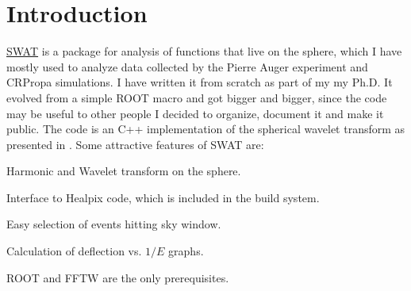 \documentclass[12pt]{article}
\begin{document}
  \vfill


\newpage
\tableofcontents

\newpage
\section{Introduction} \label{ch::Introduction}

\href{http://www.ifi.unicamp.br/~mzimbres}{SWAT} is a package for analysis of
functions that live on the sphere, which I have mostly used to analyze data 
collected by the Pierre Auger experiment and CRPropa simulations. I have written it from
scratch as part of my my Ph.D. It evolved from a simple ROOT macro and
got bigger and bigger, since the code may be useful to other people I decided
to organize, document it and make it public. The code is an C++ implementation
of the spherical wavelet transform as presented in \cite{wiaux}. Some
attractive features of SWAT are:

\begin{list}{}{}
\item Harmonic and Wavelet transform on the sphere.
\item Interface to Healpix code, which is included in the build system.
\item Easy selection of events hitting sky window. 
\item Calculation of deflection vs. $1/E$ graphs.
\item ROOT and FFTW are the only prerequisites.
\end{list}
\end{document}
